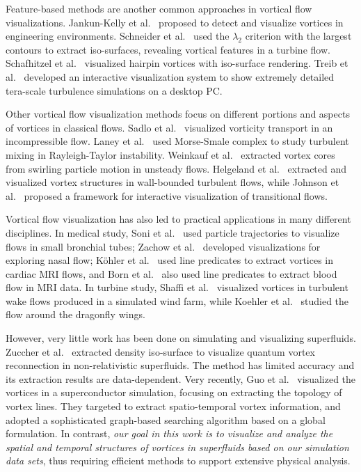 \documentclass[10pt,journal,compsoc,twoside]{IEEEtran}
\begin{document}
	Feature-based methods are another common approaches in vortical flow visualizations.
	Jankun-Kelly et al.~\cite{Jankun-Kelly_TVCG_06} proposed to detect and visualize vortices in engineering environments.
	Schneider et al.~\cite{Schneider_08} used the $\lambda_2$ criterion with the largest contours to extract iso-surfaces, revealing vortical features in a turbine flow.
	Schafhitzel et al.~\cite{Schafhitzel_11} visualized hairpin vortices with iso-surface rendering.
	Treib et al.~\cite{Treib_12} developed an interactive visualization system to show extremely detailed tera-scale turbulence simulations on a desktop PC.
	
	Other vortical flow visualization methods focus on different portions and aspects of vortices in classical flows.
	Sadlo et al.~\cite{Sadlo_TVCG_06} visualized vorticity transport in an incompressible flow.
	Laney et al.~\cite{Laney_06} used Morse-Smale complex to study turbulent mixing in Rayleigh-Taylor instability.
	Weinkauf et al.~\cite{Weinkauf_07} extracted vortex cores from swirling particle motion in unsteady flows.
	Helgeland et al.~\cite{Helgeland_07} extracted and visualized vortex structures in wall-bounded turbulent flows, while Johnson et al.~\cite{Johnson_TVCG_08} proposed a framework for interactive visualization of transitional flows.
	
	Vortical flow visualization has also led to practical applications in many different disciplines.
	In medical study, Soni et al.~\cite{Soni_08} used particle trajectories to visualize flows in small bronchial tubes;
	Zachow et al.~\cite{Zachow_09} developed visualizations for exploring nasal flow;
	K\"{o}hler et al.~\cite{Kohler_13} used line predicates to extract vortices in cardiac MRI flows, and Born et al.~\cite{Born_13} also used line predicates to extract blood flow in MRI data.
	In turbine study, Shaffi et al.~\cite{Shafii_13} visualized vortices in turbulent wake flows produced in a simulated wind farm, while Koehler et al.~\cite{Koehler_11} studied the flow around the dragonfly wings.
	
	However, very little work has been done on simulating and visualizing superfluids.
	Zuccher et al.~\cite{Zuccher_12} extracted density iso-surface to visualize quantum vortex reconnection in non-relativistic superfluids.
	The method has limited accuracy and its extraction results are data-dependent. 
	Very recently, Guo et al.~\cite{Guo_16} visualized the vortices in a superconductor simulation, focusing on extracting the topology of vortex lines.
	They targeted to extract spatio-temporal vortex information, and adopted a sophisticated graph-based searching algorithm based on a global formulation.
	In contrast, \textit{our goal in this work is to visualize and analyze the spatial and temporal structures of vortices in superfluids based on our simulation data sets}, thus requiring efficient methods to support extensive physical analysis.
	
\end{document}
